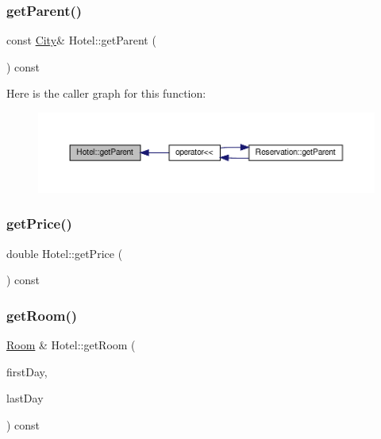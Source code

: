 \subsubsection{\texorpdfstring{get\+Parent()}{getParent()}}
{\footnotesize\ttfamily const \hyperlink{class_city}{City}\& Hotel\+::get\+Parent (\begin{DoxyParamCaption}{ }\end{DoxyParamCaption}) const\hspace{0.3cm}{\ttfamily [inline]}}

Here is the caller graph for this function\+:\nopagebreak
\begin{figure}[H]
\begin{center}
\leavevmode
\includegraphics[width=350pt]{class_hotel_a10b09b0e1309de50bc7cc6ebafb822af_icgraph}
\end{center}
\end{figure}
\mbox{\label{class_hotel_a0c9a17ff69bb3ecec9e8938b8532defa}} 
\subsubsection{\texorpdfstring{get\+Price()}{getPrice()}}
{\footnotesize\ttfamily double Hotel\+::get\+Price (\begin{DoxyParamCaption}{ }\end{DoxyParamCaption}) const\hspace{0.3cm}{\ttfamily [inline]}}

\mbox{\label{class_hotel_ac836a89654a7561169ca1523f0365861}} 
\subsubsection{\texorpdfstring{get\+Room()}{getRoom()}\hspace{0.1cm}{\footnotesize\ttfamily [1/2]}}
{\footnotesize\ttfamily \hyperlink{class_room}{Room} \& Hotel\+::get\+Room (\begin{DoxyParamCaption}\item[{Q\+Date}]{first\+Day,  }\item[{Q\+Date}]{last\+Day }\end{DoxyParamCaption}) const}

